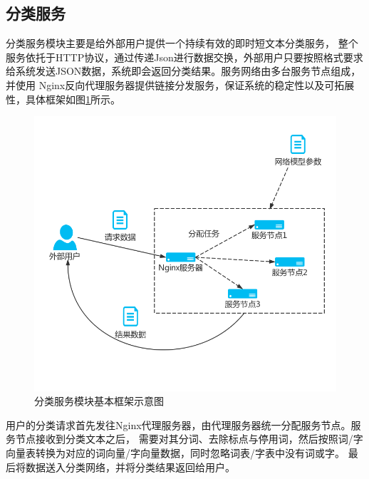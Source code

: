 \subsection{分类服务}
分类服务模块主要是给外部用户提供一个持续有效的即时短文本分类服务，
整个服务依托于HTTP协议，通过传递Json进行数据交换，外部用户只要按照格式要求
给系统发送JSON数据，系统即会返回分类结果。服务网络由多台服务节点组成，并使用
Nginx反向代理服务器提供链接分发服务，保证系统的稳定性以及可拓展性，具体框架如图\ref{server_chart}所示。
\begin{figure}[!hbp]
    \includegraphics[scale=0.6]{picture/server_chart.png}
    \caption{分类服务模块基本框架示意图}
    \label{server_chart}
\end{figure}

用户的分类请求首先发往Nginx代理服务器，由代理服务器统一分配服务节点。服务节点接收到分类文本之后，
需要对其分词、去除标点与停用词，然后按照词/字向量表转换为对应的词向量/字向量数据，同时忽略词表/字表中没有词或字。
最后将数据送入分类网络，并将分类结果返回给用户。
